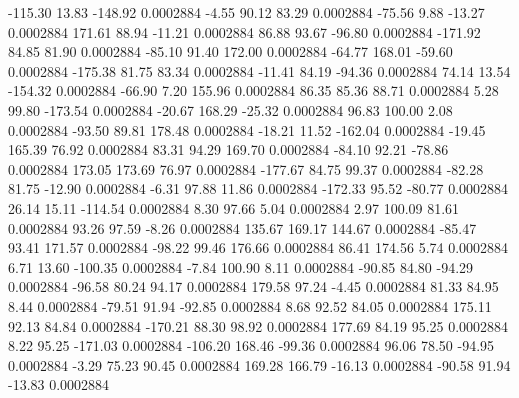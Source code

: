      -115.30       13.83     -148.92     0.0002884
       -4.55       90.12       83.29     0.0002884
      -75.56        9.88      -13.27     0.0002884
      171.61       88.94      -11.21     0.0002884
       86.88       93.67      -96.80     0.0002884
     -171.92       84.85       81.90     0.0002884
      -85.10       91.40      172.00     0.0002884
      -64.77      168.01      -59.60     0.0002884
     -175.38       81.75       83.34     0.0002884
      -11.41       84.19      -94.36     0.0002884
       74.14       13.54     -154.32     0.0002884
      -66.90        7.20      155.96     0.0002884
       86.35       85.36       88.71     0.0002884
        5.28       99.80     -173.54     0.0002884
      -20.67      168.29      -25.32     0.0002884
       96.83      100.00        2.08     0.0002884
      -93.50       89.81      178.48     0.0002884
      -18.21       11.52     -162.04     0.0002884
      -19.45      165.39       76.92     0.0002884
       83.31       94.29      169.70     0.0002884
      -84.10       92.21      -78.86     0.0002884
      173.05      173.69       76.97     0.0002884
     -177.67       84.75       99.37     0.0002884
      -82.28       81.75      -12.90     0.0002884
       -6.31       97.88       11.86     0.0002884
     -172.33       95.52      -80.77     0.0002884
       26.14       15.11     -114.54     0.0002884
        8.30       97.66        5.04     0.0002884
        2.97      100.09       81.61     0.0002884
       93.26       97.59       -8.26     0.0002884
      135.67      169.17      144.67     0.0002884
      -85.47       93.41      171.57     0.0002884
      -98.22       99.46      176.66     0.0002884
       86.41      174.56        5.74     0.0002884
        6.71       13.60     -100.35     0.0002884
       -7.84      100.90        8.11     0.0002884
      -90.85       84.80      -94.29     0.0002884
      -96.58       80.24       94.17     0.0002884
      179.58       97.24       -4.45     0.0002884
       81.33       84.95        8.44     0.0002884
      -79.51       91.94      -92.85     0.0002884
        8.68       92.52       84.05     0.0002884
      175.11       92.13       84.84     0.0002884
     -170.21       88.30       98.92     0.0002884
      177.69       84.19       95.25     0.0002884
        8.22       95.25     -171.03     0.0002884
     -106.20      168.46      -99.36     0.0002884
       96.06       78.50      -94.95     0.0002884
       -3.29       75.23       90.45     0.0002884
      169.28      166.79      -16.13     0.0002884
      -90.58       91.94      -13.83     0.0002884
